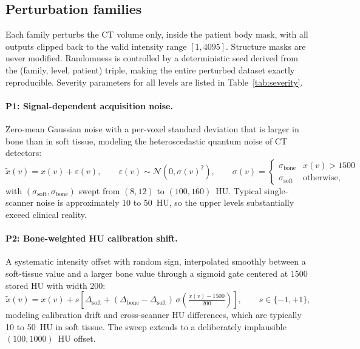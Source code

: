 \documentclass[11pt]{article}
\begin{document}
\subsection{Perturbation families}
\label{sec:families}

Each family perturbs the CT volume only, inside the patient body mask, with
all outputs clipped back to the valid intensity range $[1, 4095]$. Structure
masks are never modified. Randomness is controlled by a deterministic seed
derived from the (family, level, patient) triple, making the entire perturbed
dataset exactly reproducible. Severity parameters for all levels are listed in
Table~\ref{tab:severity}.

\paragraph{P1: Signal-dependent acquisition noise.} Zero-mean Gaussian noise
with a per-voxel standard deviation that is larger in bone than in soft
tissue, modeling the heteroscedastic quantum noise of CT detectors:
\begin{equation}
\tilde{x}(v) = x(v) + \varepsilon(v), \qquad
\varepsilon(v) \sim \mathcal{N}\!\left(0, \sigma(v)^2\right), \qquad
\sigma(v) = \begin{cases} \sigma_\mathrm{bone} & x(v) > 1500 \\
\sigma_\mathrm{soft} & \text{otherwise,} \end{cases}
\end{equation}
with $(\sigma_\mathrm{soft}, \sigma_\mathrm{bone})$ swept from $(8, 12)$ to
$(100, 160)$~HU. Typical single-scanner noise is approximately 10 to 50~HU,
so the upper levels substantially exceed clinical reality.

\paragraph{P2: Bone-weighted HU calibration shift.} A systematic intensity
offset with random sign, interpolated smoothly between a soft-tissue value
and a larger bone value through a sigmoid gate centered at 1500 stored HU
with width 200:
\begin{equation}
\tilde{x}(v) = x(v) + s\left[\Delta_\mathrm{soft} +
(\Delta_\mathrm{bone} - \Delta_\mathrm{soft})\,
\sigma\!\left(\tfrac{x(v) - 1500}{200}\right)\right],
\qquad s \in \{-1, +1\},
\end{equation}
modeling calibration drift and cross-scanner HU differences, which are
typically 10 to 50~HU in soft tissue. The sweep extends to a deliberately
implausible $(100, 1000)$~HU offset.
\end{document}
